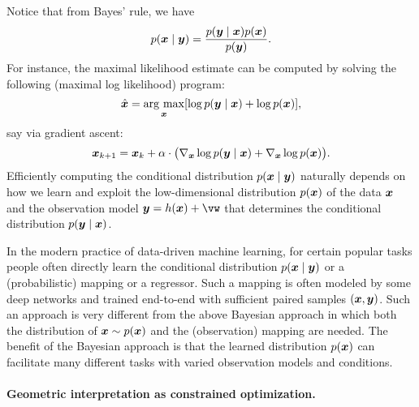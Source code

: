 \documentclass[../../book-main.tex]{subfiles}
\begin{document}
Notice that from Bayes' rule, we have
\begin{equation}
  p(\bm{x}\mid \bm{y}) = \frac{p(\bm{y}\mid \bm{x}) p(\bm{x}) }{p(\bm{y})}.
\end{equation} 
For instance, the maximal likelihood estimate can be computed by solving the following (maximal log likelihood) program:
\begin{equation}
    \hat{\bm{x}} = \operatorname*{arg\ max}_{\bm{x}} [\log p(\bm{y}\mid \bm{x}) + \log p(\bm{x})], 
\end{equation}
say via gradient ascent:
\begin{equation}
    \bm{x}_{k+1} = \bm{x}_k + \alpha \cdot \big(\nabla_{\bm{x}} \log p(\bm{y} \mid \bm{x}) + \nabla_{\bm{x}} \log p(\bm{x})\big).
    \label{eqn:loglikelihoo-gradient-ascent}
\end{equation}
Efficiently computing the conditional distribution $p(\bm{x} \mid \bm{y})$ naturally depends on how we learn and exploit the low-dimensional distribution $p(\bm{x})$ of the data $\bm{x}$ and the observation model $\y = h(\x) + \vw$ that determines the conditional distribution $p(\bm{y} \mid \bm{x})$. 

\begin{remark}
In the modern practice of data-driven machine learning, for certain popular tasks people often directly learn the conditional distribution $p(\bm{x}\mid \bm{y})$ or a (probabilistic) mapping or a regressor. Such a mapping is often modeled by some deep networks and trained end-to-end with sufficient paired samples $(\bm{x}, \bm{y})$. Such an approach is very different from the above Bayesian approach in which both the distribution of $\bm{x} \sim p(\bm{x})$ and the (observation) mapping are needed. The benefit of the Bayesian approach is that the learned distribution $p(\bm{x})$ can facilitate many different tasks with varied observation models and conditions. 
\end{remark}

\paragraph{Geometric interpretation as constrained optimization.}
\end{document}
